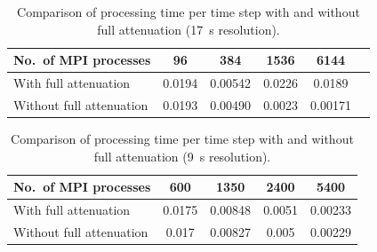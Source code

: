 \begin{table}[]
\centering
  \caption[Processing time with and without full attenutation at 17~s resolution]
    {\small{Comparison of processing time per time step with and without
      full attenuation (17~s resolution).}}
\label{tbl:comp256}
    \begin{tabular}{lccccc}
	  No.\ of MPI processes & 96 & 384 & 1536 & 6144 		       		 \\
    \midrule
	  With full attenuation & 0.0194 &0.00542 & 0.0226 & 0.0189 \\
    Without full attenuation & 0.0193 & 0.00490 & 0.0023 & 0.00171		       		 \\
    \end{tabular}
 \end{table}

 \begin{table}[]
\centering
   \caption[Processing time with and without full attenuation at 9~s resolution]
   {\small{Comparison of processing time per time step with and without
      full attenuation (9~s resolution).}}
\label{tbl:comp480}
     \begin{tabular}{lcccc}
	  No.\ of MPI processes & 600 & 1350 & 2400 & 5400 		       		 \\
    \midrule
	  With full attenuation & 0.0175 &0.00848 & 0.0051 & 0.00233 \\
    Without full attenuation & 0.017 & 0.00827 & 0.005 & 0.00229	       		 \\
    \end{tabular}
 \end{table}

